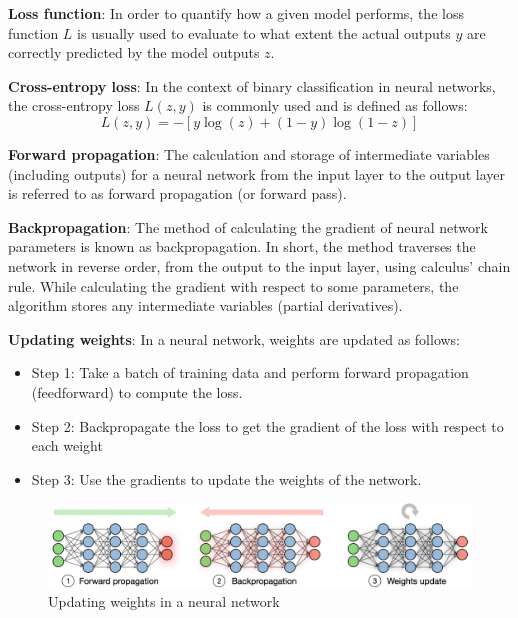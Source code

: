 \textbf{Loss function}: In order to quantify how a given model performs, the loss function $L$ is usually used to evaluate to what extent the actual outputs $y$ are correctly predicted by the model outputs $z$.

\textbf{Cross-entropy loss}: In the context of binary classification in neural networks, the cross-entropy loss $L(z,y)$ is commonly used and is defined as follows:
\begin{equation}
    L(z,y) = -[y \log (z) + (1-y) \log (1-z)]
\end{equation}

\textbf{Forward propagation}: The calculation and storage of intermediate variables (including outputs) for a neural network from the input layer to the output layer is referred to as forward propagation (or forward pass).

\textbf{Backpropagation}: The method of calculating the gradient of neural network parameters is known as backpropagation. In short, the method traverses the network in reverse order, from the output to the input layer, using calculus' chain rule. While calculating the gradient with respect to some parameters, the algorithm stores any intermediate variables (partial derivatives).

\textbf{Updating weights}: In a neural network, weights are updated as follows:

\begin{itemize}
    \item[] Step 1: Take a batch of training data and perform forward propagation (feedforward) to compute the loss.
    \item[] Step 2: Backpropagate the loss to get the gradient of the loss with respect to each weight
    \item[] Step 3: Use the gradients to update the weights of the network.
\end{itemize}

\begin{figure}[!h]
    \centering
    \includegraphics[width=1.0\textwidth]{figures/backpropagation.png}
    \caption{Updating weights in a neural network \cite{amidi2018deep}}
    \label{backpropagation}
\end{figure}


